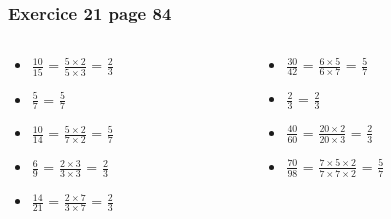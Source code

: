 \documentclass[xcolor={dvipsnames}]{beamer}
\begin{document}
\begin{frame}
	\frametitle{Exercice 21 page 84}
	
	\begin{columns}
		\begin{column}{0.5\textwidth}
			\begin{huge}
				\begin{itemize}
					\setlength\itemsep{1em}
					\item $\frac{10}{15}$ = \pause $\frac{5 \times 2}{5 \times 3}$ = \pause $\frac{2}{3}$\pause
					
					\item $\frac{5}{7}$ = \pause $\frac{5}{7}$\pause
					
					\item $\frac{10}{14}$ = \pause $\frac{5 \times 2}{7 \times 2}$ = \pause $\frac{5}{7}$\pause
					
					\item $\frac{6}{9}$ = \pause $\frac{2 \times 3}{3 \times 3}$ = \pause $\frac{2}{3}$\pause
					
					\item $\frac{14}{21}$ = \pause $\frac{2 \times 7}{3 \times 7}$ = \pause $\frac{2}{3}$\pause
				\end{itemize}	
			\end{huge}
			
		\end{column}
		
		
		\begin{column}{0.5\textwidth}
			\begin{huge}
				\begin{itemize}
					\setlength\itemsep{1em}
					\item $\frac{30}{42}$ = \pause $\frac{6 \times 5}{6 \times 7}$ = \pause $\frac{5}{7}$\pause
					
					\item $\frac{2}{3}$ = \pause $\frac{2}{3}$\pause
					
					\item $\frac{40}{60}$ = \pause $\frac{20 \times 2}{20 \times 3}$ = \pause $\frac{2}{3}$\pause
					
					\item $\frac{70}{98}$ = \pause $\frac{7 \times 5 \times 2}{7 \times 7 \times 2}$ = \pause $\frac{5}{7}$
				\end{itemize}	
			\end{huge}
			
		\end{column}
	\end{columns}		
	
	
\end{frame}
\end{document}
